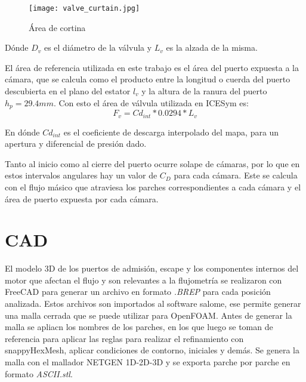 \begin{figure}
  \centering
  \texttt{[image: valve\_curtain.jpg]}
  \caption{Área de cortina}\label{fig:area_cortina}
\end{figure}

Dónde $D_v$ es el diámetro de la válvula y $L_v$ es la alzada de la misma.

El área de referencia utilizada en este trabajo es el área del puerto expuesta a
la cámara, que se calcula como el producto entre la longitud o cuerda del puerto
descubierta en el plano del estator $l_v$ y la altura de la ranura del puerto
$h_p=29.4mm$.
%
Con esto el área de válvula utilizada en ICESym es:
\begin{equation}
  \label{eq:fv}
  F_v = Cd_{int}*0.0294*L_v
\end{equation}

En dónde $Cd_{int}$ es el coeficiente de descarga interpolado del mapa, para un apertura
y diferencial de presión dado.


%
Tanto al inicio como al cierre del puerto ocurre solape de cámaras, por lo que
en estos intervalos angulares hay un valor de $C_D$ para cada cámara.
%
Este se calcula con el flujo másico que atraviesa los parches correspondientes
a cada cámara y el área de puerto expuesta por cada cámara.

\section{CAD}
%
El modelo 3D de los puertos de admisión, escape y los componentes internos del
motor que afectan el flujo y son relevantes a la flujometría se realizaron con
FreeCAD\cite{freecad} para generar un archivo en formato \emph{.BREP} para cada
posición analizada.
%
Estos archivos son importados al software salome\cite{salome}, ese permite
generar una malla cerrada que se puede utilizar para OpenFOAM.\@
%
Antes de generar la malla se apliacn los nombres de los parches, en los que
luego se toman de referencia para aplicar las reglas para realizar el
refinamiento con snappyHexMesh, aplicar condiciones de contorno, iniciales y
demás.
%
Se genera la malla con el mallador NETGEN 1D-2D-3D y se exporta parche por
parche en formato \emph{ASCII.stl}.

